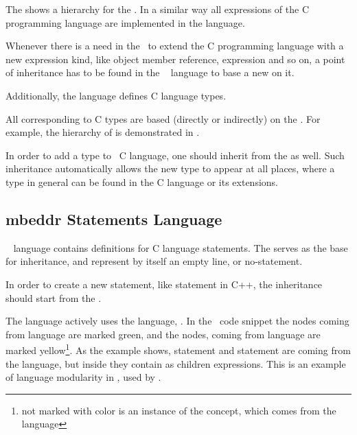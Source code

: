 
The  shows a hierarchy for the  . In a similar way all expressions of the 
C programming language are implemented in the  language.

Whenever there is a need in the \cpppl\ to extend the C programming language with a new expression kind, like 
object member reference,  expression and so on, a point of inheritance has to be found in the 
\mbdr\  language to base a new  on it.

Additionally, the  language defines  C language types. 


All  corresponding to C types are based (directly or indirectly) on the  .
For example, the hierarchy of   is demonstrated in . 

In order to add a type to \mbdr\ C language, one should inherit from the   as well.
Such inheritance automatically allows the new type to appear at all places, where a type in general can be found
in the C language or its extensions.


\subsection{mbeddr Statements Language}

\mbdr\  language contains definitions for C language statements. The   serves as the
base for inheritance, and represent by itself an empty line, or no-statement.

In order to create a new statement, like  statement in C++, the inheritance should start from the  .


The  language actively uses the  language, . In the \mbdr\ code snippet
the nodes coming from  language are marked green, and the nodes, coming from  language are
marked yellow\footnote{not marked with color is an instance of the  concept, which comes from the  language}. As the example shows,  statement and  statement are coming from the  language,
but inside they contain as children expressions. This is an example of language modularity in \jbmps, used by \mbdr.

